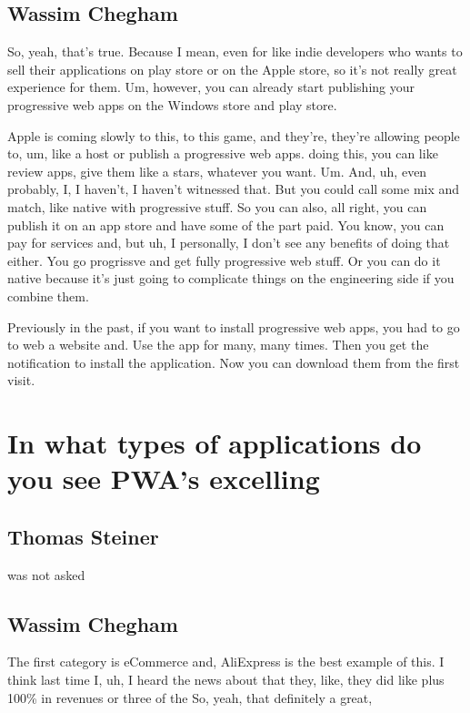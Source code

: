 		\subsection{Wassim Chegham}
			So, yeah, that's true. Because I mean, even for like indie developers who wants to sell their applications on play store or on the Apple store, so it's not really great experience for them. Um, however, you can already start publishing your progressive web apps on the Windows store and play store.
			
			Apple is coming slowly to this, to this game, and they're, they're allowing people to, um, like a host or publish a progressive web apps. doing this, you can like review apps, give them like a stars, whatever you want. Um. And, uh, even probably, I, I haven't, I haven't witnessed that. But you could call some mix and match, like native with progressive stuff. So you can also, all right, you can publish it on an app store and have some of the part paid. You know, you can pay for services and, but uh, I personally, I don't see any benefits of doing that either. You go progrissve and  get fully progressive web stuff. Or you can do it native because it's just going to complicate things on the engineering side if you combine them. 
			
			Previously in the past, if you want to install  progressive web apps, you had to go to web a website and. Use the app for many, many times. Then you get the notification to install the application. Now you can download them from the first visit.
		
				
	\section{In what types of applications do you see PWA's excelling}
		
		\subsection{Thomas Steiner}
			was not asked

		\subsection{Wassim Chegham}	
			 The first category is eCommerce and, AliExpress is the best example of this. I think last time I, uh, I heard the news about that they, like, they did like plus 100\% in revenues or three of the So, yeah, that definitely a great, 
			 
